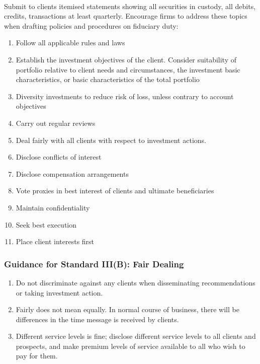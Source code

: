 \begin{remark} \\
Submit to clients itemised statements showing all securities in custody, all debits, credits, transactions at least quarterly. Encourage firms to address these topics when drafting policies and procedures on fiduciary duty:
\begin{enumerate}[label=\roman*.]
\setlength{\itemsep}{0pt}
\item Follow all applicable rules and laws
\item Establish the investment objectives of the client. Consider suitability of portfolio relative to client needs and circumstances, the investment basic characteristics, or basic characteristics of the total portfolio
\item Diversity investments to reduce risk of loss, unless contrary to account objectives
\item Carry out regular reviews
\item Deal fairly with all clients with respect to investment actions.
\item Disclose conflicts of interest
\item Disclose compensation arrangements
\item Vote proxies in best interest of clients and ultimate beneficiaries
\item Maintain confidentiality
\item Seek best execution
\item Place client interests first
\end{enumerate}
\end{remark}

\subsubsection{Guidance for Standard III(B): Fair Dealing}

\begin{remark} 
\begin{enumerate}[label=\roman*.]
\setlength{\itemsep}{0pt}
\item Do not discriminate against any clients when disseminating recommendations or taking investment action. 
\item Fairly does not mean equally. In normal course of business, there will be differences in the time message is received by clients. 
\item Different service levels is fine; disclose different service levels to all clients and prospects, and make premium levels of service available to all who wish to pay for them.
\end{enumerate}
\end{remark}

